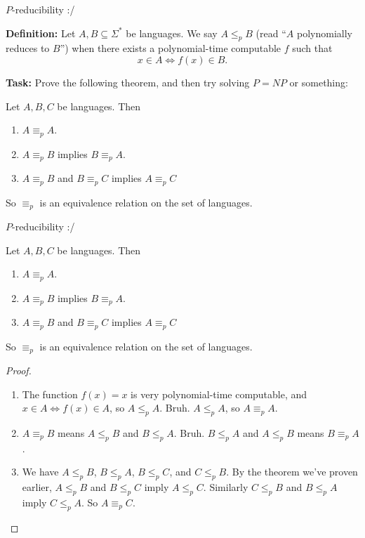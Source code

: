 \documentclass{beamer}
\begin{document}
\begin{frame}{$P$-reducibility :/} 

\textbf{Definition:} Let $A, B \subseteq \Sigma^*$ be languages. We say $A \leq_p B$ (read ``$A$ polynomially reduces to $B$'') when there exists a polynomial-time computable $f$ such that
$$x \in A \Leftrightarrow f(x) \in B.$$

\textbf{Task:} Prove the following theorem, and then try solving $P = NP$ or something:
\begin{theorem}
Let $A, B, C$ be languages. Then
\begin{enumerate}
\item $A \equiv_p A$.
\item $A \equiv_p B$ implies $B \equiv_p A$.
\item $A \equiv_p B$ and $B \equiv_p C$ implies $A \equiv_p C$
\end{enumerate}
So $\equiv_p$ is an equivalence relation on the set of languages.
\end{theorem}
\end{frame}

\begin{frame}{$P$-reducibility :/} 
\begin{theorem}
Let $A, B, C$ be languages. Then
\begin{enumerate}
\item $A \equiv_p A$.
\item $A \equiv_p B$ implies $B \equiv_p A$.
\item $A \equiv_p B$ and $B \equiv_p C$ implies $A \equiv_p C$
\end{enumerate}
So $\equiv_p$ is an equivalence relation on the set of languages.
\end{theorem}

\vspace{-4mm}

\begin{proof}
\begin{enumerate}
\item The function $f(x) = x$ is very polynomial-time computable, and $x \in A \Leftrightarrow f(x) \in A$, so $A \leq_p A$. Bruh. $A \leq_p A$, so $A \equiv_p A$.
\item $A \equiv_p B$ means $A \leq_p B$ and $B \leq_p A$. Bruh. $B \leq_p A$ and $A \leq_p B$ means $B \equiv_p A$.
\item We have $A \leq_p B$, $B \leq_p A$, $B \leq_p C$, and $C \leq_p B$. By the theorem we've proven earlier, $A \leq_p B$ and $B \leq_p C$ imply $A \leq_p C$. Similarly $C \leq_p B$ and $B \leq_p A$ imply $C \leq_p A$. So $A \equiv_p C$.

\end{enumerate}
\end{proof}
\end{frame}
\end{document}
